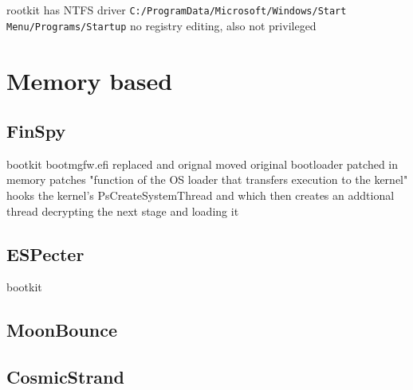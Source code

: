 rootkit
has NTFS driver
\lstinline{C:/ProgramData/Microsoft/Windows/Start Menu/Programs/Startup}
no registry editing, also not privileged

\section{Memory based}


\subsection{FinSpy}


bootkit
bootmgfw.efi replaced and orignal moved
original bootloader patched in memory
patches "function of the OS loader that transfers execution to the kernel"
hooks the kernel's PsCreateSystemThread and which then creates an addtional thread decrypting the next stage and loading it


\subsection{ESPecter}

bootkit


\subsection{MoonBounce}

\subsection{CosmicStrand}
